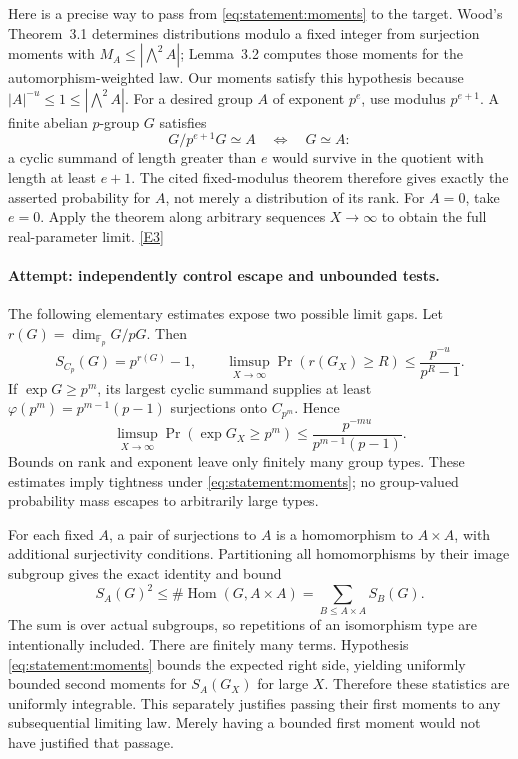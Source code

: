 \documentclass[11pt,a4paper]{article}
\newcommand{\F}{\mathbb{F}}
\newcommand{\eref}[2]{\hyperlink{extra:#1:#2}{[E#2]}}
\numberwithin{equation}{section}
\begin{document}
Here is a precise way to pass from \eqref{eq:statement:moments} to the target.
Wood's Theorem~3.1 determines distributions modulo a fixed integer from
surjection moments with $M_A\leq|\bigwedge^2 A|$; Lemma~3.2 computes
those moments for the automorphism-weighted law. Our moments satisfy this
hypothesis because $|A|^{-u}\leq1\leq|\bigwedge^2 A|$.
For a desired group $A$ of exponent $p^e$, use modulus $p^{e+1}$.
A finite abelian $p$-group $G$ satisfies
\[
 G/p^{e+1}G\simeq A\quad\Longleftrightarrow\quad G\simeq A:
\]
a cyclic summand of length greater than $e$ would survive in the quotient
with length at least $e+1$. The cited fixed-modulus theorem therefore
gives exactly the asserted probability for $A$, not merely a distribution
of its rank. For $A=0$, take $e=0$. Apply the theorem along arbitrary
sequences $X\to\infty$ to obtain the full real-parameter limit.
\eref{statement}{3}

\paragraph{Attempt: independently control escape and unbounded tests.}
The following elementary estimates expose two possible limit gaps.
Let $r(G)=\dim_{\F_p}G/pG$. Then
\[
 S_{C_p}(G)=p^{r(G)}-1,
 \qquad
 \limsup_{X\to\infty}\Pr(r(G_X)\geq R)
 \leq\frac{p^{-u}}{p^R-1}.
\]
If $\exp G\geq p^m$, its largest cyclic summand supplies at least
$\varphi(p^m)=p^{m-1}(p-1)$ surjections onto $C_{p^m}$. Hence
\begin{equation}\label{eq:statement:tail}
 \limsup_{X\to\infty}\Pr(\exp G_X\geq p^m)
 \leq\frac{p^{-mu}}{p^{m-1}(p-1)}.
\end{equation}
Bounds on rank and exponent leave only finitely many group types. These
estimates imply tightness under \eqref{eq:statement:moments}; no group-valued
probability mass escapes to arbitrarily large types.

For each fixed $A$, a pair of surjections to $A$ is a homomorphism to
$A\times A$, with additional surjectivity conditions. Partitioning all
homomorphisms by their image subgroup gives the exact identity and bound
\begin{equation}\label{eq:statement:UI}
 S_A(G)^2\leq\#\operatorname{Hom}(G,A\times A)
 =\sum_{B\leq A\times A}S_B(G).
\end{equation}
The sum is over actual subgroups, so repetitions of an isomorphism type
are intentionally included. There are finitely many terms. Hypothesis
\eqref{eq:statement:moments} bounds the expected right side, yielding uniformly
bounded second moments for $S_A(G_X)$ for large $X$. Therefore these
statistics are uniformly integrable. This separately justifies passing
their first moments to any subsequential limiting law. Merely having a
bounded first moment would not have justified that passage.
\end{document}
